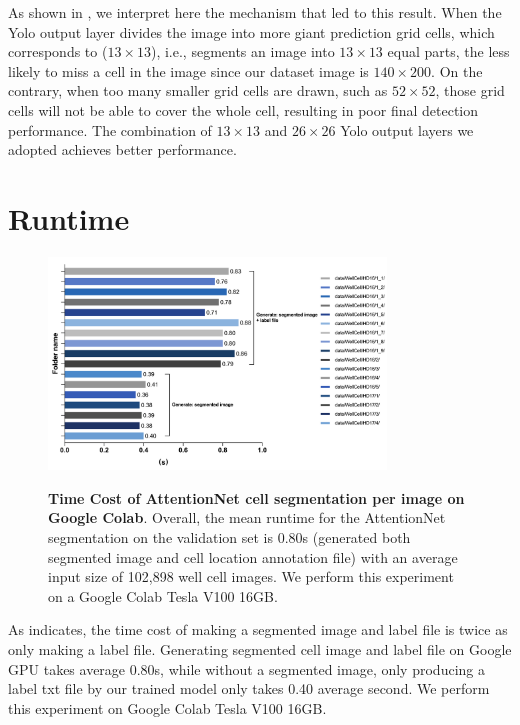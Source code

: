 As shown in \eg{}, we interpret here the mechanism that led to this result. When the Yolo output layer divides the image into more giant prediction grid cells, which corresponds to ($13\times13$), i.e., segments an image into $13\times13 $ equal parts, the less likely to miss a cell in the image since our dataset image is $140\times200$. On the contrary, when too many smaller grid cells are drawn, such as $ 52\times52$, those grid cells will not be able to cover the whole cell, resulting in poor final detection performance. The combination of $13\times13$ and $ 26\times26$ Yolo output layers we adopted achieves better performance. 

\section{Runtime}
\label{sec:ipsum}

\begin{figure}[h]
\begin{center}
\includegraphics[width=0.8\textwidth]{thesis-template-master/images/Duration (1).png}
\label{fig:cost}
\end{center}
\caption{\textbf{Time Cost of AttentionNet cell segmentation per image on Google Colab}. Overall, the mean runtime for the AttentionNet segmentation on the validation set is 0.80s (generated both segmented image and cell location annotation file) with an average input size of 102,898 well cell images. We perform this experiment on a  Google Colab Tesla V100 16GB.}
\label{fig:5.2}
\end{figure}

As \eg{} indicates, the time cost of making a segmented image and label file is twice as only making a label file. Generating segmented cell image and label file on Google GPU  takes average 0.80s, while without a segmented image, only producing a label txt file by our trained model only takes 0.40 average second. We perform this experiment on  Google Colab Tesla V100 16GB.

